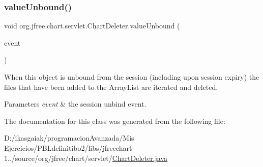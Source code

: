 \subsubsection{\texorpdfstring{value\+Unbound()}{valueUnbound()}}
{\footnotesize\ttfamily void org.\+jfree.\+chart.\+servlet.\+Chart\+Deleter.\+value\+Unbound (\begin{DoxyParamCaption}\item[{Http\+Session\+Binding\+Event}]{event }\end{DoxyParamCaption})}

When this object is unbound from the session (including upon session expiry) the files that have been added to the Array\+List are iterated and deleted.


\begin{DoxyParams}{Parameters}
{\em event} & the session unbind event. \\
\hline
\end{DoxyParams}


The documentation for this class was generated from the following file\+:\begin{DoxyCompactItemize}
\item 
D\+:/ikasgaiak/programacion\+Avanzada/\+Mis Ejercicios/\+P\+B\+Ldefinitibo2/libs/jfreechart-\/1../source/org/jfree/chart/servlet/\mbox{\hyperlink{_chart_deleter_8java}{Chart\+Deleter.\+java}}\end{DoxyCompactItemize}
